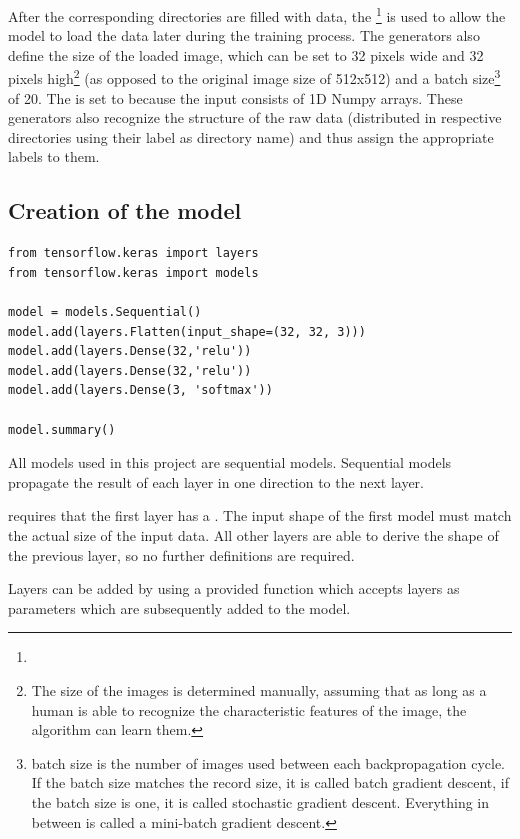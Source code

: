 After the corresponding directories are filled with data, the \footnote{} is used to allow the model to load the data later during the training process.
The generators also define the size of the loaded image, which can be set to 32 pixels wide and 32 pixels high\footnote{The size of the images is determined manually, assuming that as long as a human is able to recognize the characteristic features of the image, the algorithm can learn them.} (as opposed to the original image size of 512x512) and a batch size\footnote{batch size is the number of images used between each backpropagation cycle.
If the batch size matches the record size, it is called batch gradient descent, if the batch size is one, it is called stochastic gradient descent.
Everything in between is called a mini-batch gradient descent.} of 20.
The  is set to  because the input consists of 1D Numpy arrays.
These generators also recognize the structure of the raw data (distributed in respective directories using their label as directory name) and thus assign the appropriate labels to them.

\subsection{Creation of the model}

\begin{lstlisting}[label={lst:first_model}]
from tensorflow.keras import layers
from tensorflow.keras import models

model = models.Sequential()
model.add(layers.Flatten(input_shape=(32, 32, 3)))
model.add(layers.Dense(32,'relu'))
model.add(layers.Dense(32,'relu'))
model.add(layers.Dense(3, 'softmax'))

model.summary()
\end{lstlisting}

All models used in this project are sequential models.
Sequential models propagate the result of each layer in one direction to the next layer.

 requires that the first layer has a .
The input shape of the first model must match the actual size of the input data.
All other layers are able to derive the shape of the previous layer, so no further definitions are required.

Layers can be added by using a provided  function which accepts layers as parameters which are subsequently added to the model.

